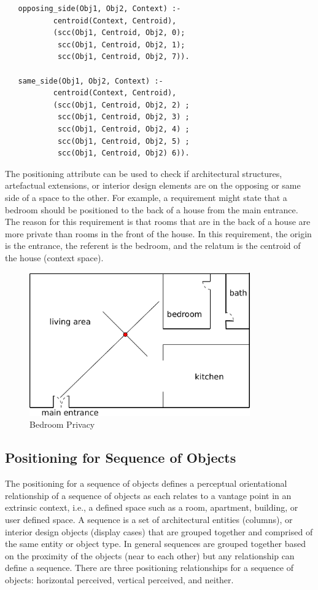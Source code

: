 \documentclass[12pt]{ucthesis}
\begin{document}
\begin{verbatim}
   opposing_side(Obj1, Obj2, Context) :- 
           centroid(Context, Centroid),
           (scc(Obj1, Centroid, Obj2, 0);
            scc(Obj1, Centroid, Obj2, 1);
            scc(Obj1, Centroid, Obj2, 7)).
                                          
   same_side(Obj1, Obj2, Context) :- 
           centroid(Context, Centroid),
           (scc(Obj1, Centroid, Obj2, 2) ;
            scc(Obj1, Centroid, Obj2, 3) ;
            scc(Obj1, Centroid, Obj2, 4) ;
            scc(Obj1, Centroid, Obj2, 5) ;
            scc(Obj1, Centroid, Obj2) 6)).   

\end{verbatim}

The positioning attribute can be used to check if architectural structures, artefactual extensions, or interior design elements are on the opposing or same side of a space to the other. For example, a requirement might state that a bedroom should be positioned to the back of a house from the main entrance. The reason for this requirement is that rooms that are in the back of a house are more private than rooms in the front of the house. In this requirement, the origin is the entrance, the referent is the bedroom, and the relatum is the centroid of the house (context space).

\begin{figure}[H]
 \centering
 \includegraphics[width=95mm]{bedroom-back-house}
 \caption{Bedroom Privacy}
\label{privacy}
\end{figure}

\subsection{Positioning for Sequence of Objects}
The positioning for a sequence of objects defines a perceptual orientational relationship of a sequence of objects as each relates to a vantage point in an extrinsic context, i.e., a defined space such as a room, apartment, building, or user defined space. A sequence is a set of architectural entities (columns), or interior design objects (display cases) that are grouped together and comprised of the same entity or object type. In general sequences are grouped together based on the proximity of the objects (near to each other) but any relationship can define a sequence. There are three positioning relationships for a sequence of objects: horizontal perceived, vertical perceived, and neither.  
\end{document}

